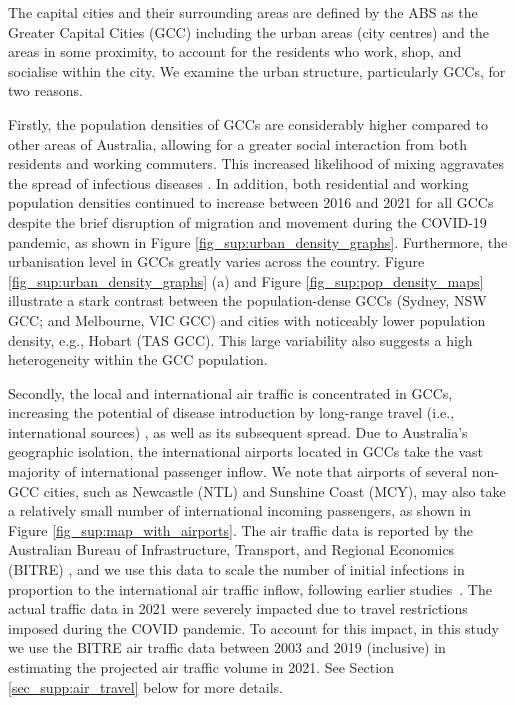 \documentclass{article}
\begin{document}
\begin{appendices}
The capital cities and their surrounding areas are defined by the ABS as the Greater Capital Cities (GCC) including the urban areas (city centres) and the areas in some proximity, to account for the residents who work, shop, and socialise within the city. We examine the urban structure, particularly GCCs, for two reasons.

 Firstly, the population densities of GCCs are considerably higher compared to other areas of Australia, allowing for a greater social interaction from both residents and working commuters. This increased likelihood of mixing aggravates the spread of infectious diseases \cite{dye_health_2008, eubank_modelling_2004, yashima_epidemic_2014}. In addition, both residential and working population densities continued to increase between 2016 and 2021 for all GCCs despite the brief disruption of migration and movement during the COVID-19 pandemic, as shown in Figure \ref{fig_sup:urban_density_graphs}. Furthermore, the urbanisation level in GCCs  greatly varies  across the country. Figure \ref{fig_sup:urban_density_graphs} (a) and Figure \ref{fig_sup:pop_density_maps} illustrate a stark contrast between the population-dense GCCs (Sydney, NSW GCC; and Melbourne, VIC GCC) and cities with noticeably lower population density, e.g., Hobart (TAS GCC). This large variability also suggests a high heterogeneity within the GCC population.

 
 Secondly, the local and international air traffic is concentrated in GCCs, increasing the potential of disease introduction by long-range travel (i.e., international sources)  \cite{brueckner_airline_2003}, as well as its subsequent spread. Due to Australia's geographic isolation, the international airports located in GCCs take the vast majority of international passenger inflow. We note that airports of several non-GCC cities, such as Newcastle (NTL) and Sunshine Coast (MCY), may also take a relatively small number of international incoming passengers, as shown in Figure \ref{fig_sup:map_with_airports}. The air traffic data is reported by the Australian Bureau of Infrastructure, Transport, and Regional Economics (BITRE) \cite{BITRE_airport_data}, and we use this data to scale the number of initial infections in proportion to the international air traffic inflow, following earlier studies~\cite{cliff_investigating_2018,chang_modelling_2020}. The actual traffic data in 2021 were severely impacted due to travel restrictions imposed during the COVID pandemic. To account for this impact, in this study we use the BITRE air traffic data between 2003 and 2019 (inclusive) in estimating the projected air traffic volume in 2021. See Section \ref{sec_supp:air_travel} below for more details.  


\end{appendices}
\end{document}
